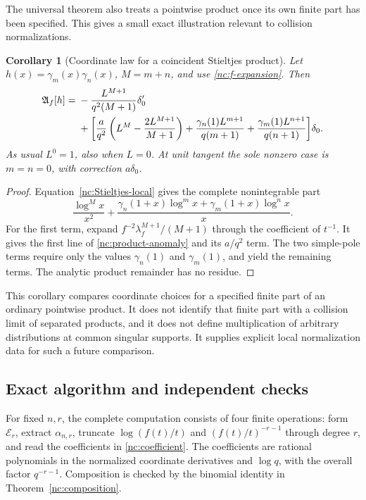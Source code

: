 \documentclass[11pt,a4paper]{article}
\numberwithin{equation}{section}
\newtheorem{corollary}[theorem]{Corollary}
\theoremstyle{definition}
\theoremstyle{remark}
\begin{document}
The universal theorem also treats a pointwise product once its own
finite part has been specified. This gives a small exact illustration
relevant to collision normalizations.

\begin{corollary}[Coordinate law for a coincident Stieltjes product]
\label{nc:coincident}
Let $h(x)=\gamma_m(x)\gamma_n(x)$, $M=m+n$, and use
\eqref{nc:f-expansion}. Then
\begin{align}\label{nc:product-anomaly}
 \mathfrak A_f[h]={}&-\frac{L^{M+1}}{q^2(M+1)}\delta_0'\notag\\
 &+\biggl[
  \frac{a}{q^2}\left(L^M-\frac{2L^{M+1}}{M+1}\right)
  +\frac{\gamma_n(1)L^{m+1}}{q(m+1)}
  +\frac{\gamma_m(1)L^{n+1}}{q(n+1)}
                  \biggr]\delta_0.
\end{align}
As usual $L^0=1$, also when $L=0$. At unit tangent the sole nonzero
case is $m=n=0$, with correction $a\delta_0$.
\end{corollary}
\begin{proof}
Equation~\eqref{nc:Stieltjes-local} gives the complete nonintegrable
part
\[
 \frac{\log^{M}x}{x^2}
 +\frac{\gamma_n(1+x)\log^m x+
         \gamma_m(1+x)\log^n x}{x}.
\]
For the first term, expand $f^{-2}\lambda_f^{M+1}/(M+1)$ through
the coefficient of $t^{-1}$. It gives the first line of
\eqref{nc:product-anomaly} and its $a/q^2$ term. The two simple-pole
terms require only the values $\gamma_n(1)$ and $\gamma_m(1)$,
and yield the remaining terms. The analytic product remainder has no
residue.
\end{proof}

This corollary compares coordinate choices for a specified finite part
of an ordinary pointwise product. It does not identify that finite
part with a collision limit of separated products, and it does not
define multiplication of arbitrary distributions at common singular
supports. It supplies explicit local normalization data for such a
future comparison.

\subsection{Exact algorithm and independent checks}

For fixed $n,r$, the complete computation consists of four finite
operations: form $\mathcal E_r$, extract $\alpha_{n,r}$, truncate
$\log(f(t)/t)$ and $(f(t)/t)^{-r-1}$ through degree $r$, and read the
coefficients in \eqref{nc:coefficient}. The coefficients are rational
polynomials in the normalized coordinate derivatives and $\log q$,
with the overall factor $q^{-r-1}$. Composition is checked by the
binomial identity in Theorem~\ref{nc:composition}.
\end{document}
